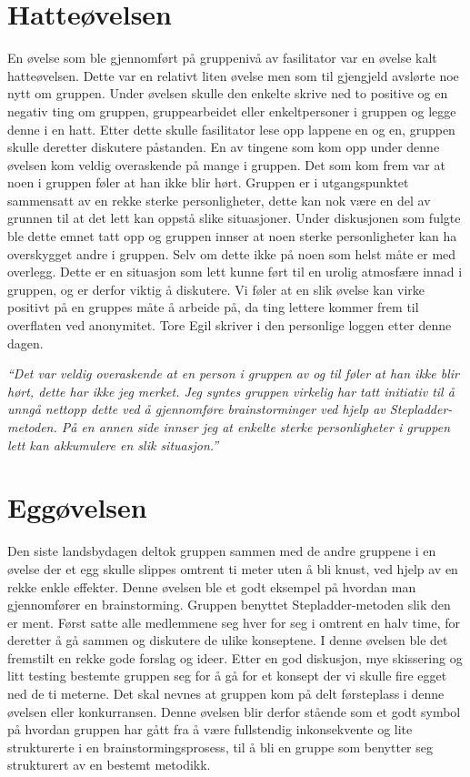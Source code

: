 \section{Hatteøvelsen}
En øvelse som ble gjennomført på gruppenivå av fasilitator var en øvelse kalt hatteøvelsen. 
Dette var en relativt liten øvelse men som til gjengjeld avslørte noe nytt om gruppen. 
Under øvelsen skulle den enkelte skrive ned to positive og en negativ ting om gruppen, gruppearbeidet eller enkeltpersoner i gruppen og legge denne i en hatt. 
Etter dette skulle fasilitator lese opp lappene en og en, gruppen skulle deretter diskutere påstanden. 
En av tingene som kom opp under denne øvelsen kom veldig overaskende på mange i gruppen. 
Det som kom frem var at noen i gruppen føler at han ikke blir hørt. 
Gruppen er i utgangspunktet sammensatt av en rekke sterke personligheter, 
dette kan nok være en del av grunnen til at det lett kan oppstå slike situasjoner. 
Under diskusjonen som fulgte ble dette emnet tatt opp og gruppen innser at noen sterke personligheter kan ha overskygget andre i gruppen. 
Selv om dette ikke på noen som helst måte er med overlegg. 
Dette er en situasjon som lett kunne ført til en urolig atmosfære innad i gruppen, og er derfor viktig å diskutere. 
Vi føler at en slik øvelse kan virke positivt på en gruppes måte å arbeide på, da ting lettere kommer frem til overflaten ved anonymitet. 
Tore Egil skriver i den personlige loggen etter denne dagen.\newline

\emph{“Det var veldig overaskende at en person i gruppen av og til føler at han ikke blir hørt, dette har ikke jeg merket. 
Jeg syntes gruppen virkelig har tatt initiativ til å unngå nettopp dette ved å gjennomføre brainstorminger ved hjelp av Stepladder-metoden. 
På en annen side innser jeg at enkelte sterke personligheter i gruppen lett kan akkumulere en slik situasjon.”}\newline

\section{Eggøvelsen}
Den siste landsbydagen deltok gruppen sammen med de andre gruppene i en øvelse der et egg skulle slippes omtrent ti meter uten å bli knust, ved hjelp av en rekke enkle effekter. Denne øvelsen ble et godt eksempel på hvordan man gjennomfører en brainstorming. 
Gruppen benyttet Stepladder-metoden slik den er ment. Først satte alle medlemmene seg hver for seg i omtrent en halv time, for deretter å gå sammen og diskutere de ulike konseptene. I denne øvelsen ble det fremstilt en rekke gode forslag og ideer. Etter en god diskusjon, mye skissering og litt testing bestemte gruppen seg for å gå for et konsept der vi skulle fire egget ned de ti meterne. Det skal nevnes at gruppen kom på delt førsteplass i denne øvelsen eller konkurransen. 
Denne øvelsen blir derfor stående som et godt symbol på hvordan gruppen har gått fra å være fullstendig inkonsekvente og lite strukturerte i en brainstormingsprosess, til å bli en gruppe som benytter seg strukturert av en bestemt metodikk. 


